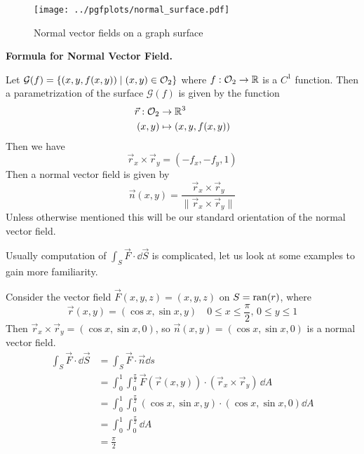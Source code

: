 \documentclass[../Analysis-3.tex]{subfiles}
\begin{document}
\begin{tcolorbox}

  \begin{figure}
    \centering
    \texttt{[image: ../pgfplots/normal\_surface.pdf]}
    \caption{Normal vector fields on a graph surface}
    \label{fig2:27}
  \end{figure}

  \textbf{Formula for Normal Vector Field.}

  Let $\mathcal{G}(f) = \qty{ (x,y,f(x,y)) \mid (x,y) \in \mathcal{O}_{2}}$ where $f: \mathcal{O}_{2} \to \mathbb{R}$ is a $C^1$ function. Then a parametrization of the surface $\mathcal{G}(f)$ is given by the function
  \begin{align*}
    \vec{r} : \mathcal{O}_{2} & \to \mathbb{R}^3             \\
    (x,y)            & \mapsto (x,y,f(x,y))
  \end{align*}
  Then we have
  \[
    \vec{r}_x \times \vec{r}_y = (-f_x, -f_y, 1)
  \]
  Then a normal vector field is given by
  \[
    \vec{n}(x,y) = \frac{\vec{r}_x \times \vec{r}_y}{\|\vec{r}_x \times \vec{r}_y \|}
  \]
  Unless otherwise mentioned this will be our standard orientation of the normal vector field.

\end{tcolorbox}

Usually computation of $\displaystyle\int_S \vec{F} \cdot \dd \vec{S}$ is complicated, let us look at some examples to gain more familiarity.

\begin{Eg}{}{}
  Consider the vector field $\vec{F}(x,y,z) = (x,y,z)$ on $S = \operatorname{ran}(r)$, where
  \[
    \vec{r}(x,y) = (\cos x, \sin x, y) \quad 0 \leq x \leq \frac{\pi}{2}, \, 0 \leq y \leq 1
  \]
  Then $\vec{r}_x \times \vec{r}_y = (\cos x, \sin x, 0)$, so $\vec{n}(x,y) = (\cos x, \sin x, 0)$ is a normal vector field.
  \begin{align*}
    \int_S \vec{F} \cdot \dd \vec{S}
     & = \int_S \vec{F} \cdot \vec{n} \dd s                                                                \\
     & = \int_0^1 \int_0^{\frac{\pi}{2}} \vec{F}(\vec{r}(x,y)) \cdot (\vec{r}_x \times \vec{r}_y) \, \dd A \\
     & = \int_0^1 \int_0^{\frac{\pi}{2}}  (\cos x, \sin x, y) \cdot (\cos x, \sin x, 0) \dd A              \\
     & = \int_0^1 \int_{0}^{\frac{\pi}{2}} \dd A                                                           \\
     & = \frac{\pi}{2}
  \end{align*}
\end{Eg}
\end{document}
